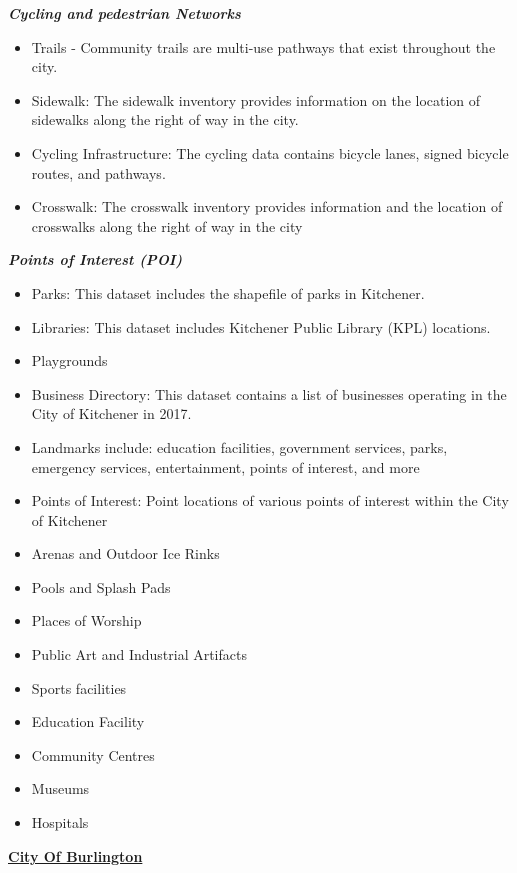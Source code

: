 \documentclass[12pt,twoside]{reedthesis}
\begin{document}
\textbf{\emph{Cycling and pedestrian Networks}}
\begin{itemize}
\item
  Trails - Community trails are multi-use pathways that exist throughout the city.
\item
  Sidewalk: The sidewalk inventory provides information on the location of sidewalks along the right of way in the city.
\item
  Cycling Infrastructure: The cycling data contains bicycle lanes, signed bicycle routes, and pathways.
\item
  Crosswalk: The crosswalk inventory provides information and the location of crosswalks along the right of way in the city
\end{itemize}
\textbf{\emph{Points of Interest (POI)}}
\begin{itemize}
\item
  Parks: This dataset includes the shapefile of parks in Kitchener.
\item
  Libraries: This dataset includes Kitchener Public Library (KPL) locations.
\item
  Playgrounds
\item
  Business Directory: This dataset contains a list of businesses operating in the City of Kitchener in 2017.
\item
  Landmarks include: education facilities, government services, parks, emergency services, entertainment, points of interest, and more
\item
  Points of Interest: Point locations of various points of interest within the City of Kitchener
\item
  Arenas and Outdoor Ice Rinks
\item
  Pools and Splash Pads
\item
  Places of Worship
\item
  Public Art and Industrial Artifacts
\item
  Sports facilities
\item
  Education Facility
\item
  Community Centres
\item
  Museums
\item
  Hospitals
\end{itemize}
\textbf{\href{https://data.waterloo.ca/search?tags=base\%20data}{City Of Burlington}}
\end{document}
